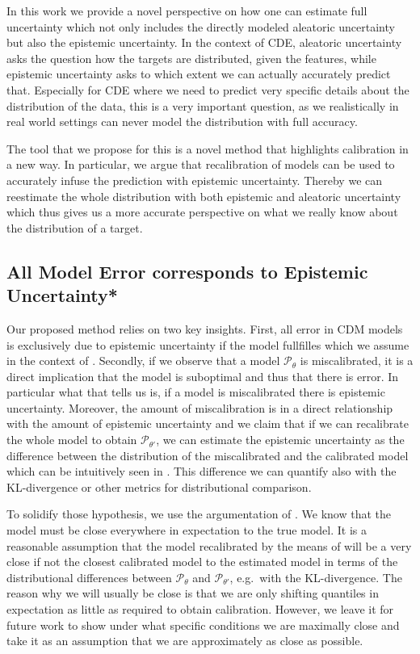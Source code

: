 In this work we provide a novel perspective on how one can estimate full uncertainty which not only includes the directly modeled aleatoric uncertainty but also the epistemic uncertainty. In the context of CDE, aleatoric uncertainty asks the question how the targets are distributed, given the features, while epistemic uncertainty asks to which extent we can actually accurately predict that. Especially for CDE where we need to predict very specific details about the distribution of the data, this is a very important question, as we realistically in real world settings can never model the distribution with full accuracy.

The tool that we propose for this is a novel method that highlights calibration in a new way. In particular, we argue that recalibration of models can be used to accurately infuse the prediction with epistemic uncertainty. Thereby we can reestimate the whole distribution with both epistemic and aleatoric uncertainty which thus gives us a more accurate perspective on what we really know about the distribution of a target.

\subsection{All Model Error corresponds to Epistemic Uncertainty*}\label{sec:uncertainty_calibration_connection}

Our proposed method relies on two key insights. First, all error in CDM models is exclusively due to epistemic uncertainty if the model fullfilles  which we assume in the context of . Secondly, if we observe that a model $\mathscr{P}_\theta$ is miscalibrated, it is a direct implication that the model is suboptimal and thus that there is error. In particular what that tells us is, if a model is miscalibrated there is epistemic uncertainty. Moreover, the amount of miscalibration is in a direct relationship with the amount of epistemic uncertainty and we claim that if we can recalibrate the whole model to obtain $\mathscr{P}_{\theta'}$, we can estimate the epistemic uncertainty as the difference between the distribution of the miscalibrated and the calibrated model which can be intuitively seen in . This difference we can quantify also with the KL-divergence or other metrics for distributional comparison.

To solidify those hypothesis, we use the argumentation of . We know that the model must be close everywhere in expectation to the true model. It is a reasonable assumption that the model recalibrated by the means of  will be a very close if not the closest calibrated model to the estimated model in terms of the distributional differences between $\mathscr{P}_\theta$ and $\mathscr{P}_{\theta'}$, e.g.\ with the KL-divergence. The reason why we will usually be close is that we are only shifting quantiles in expectation as little as required to obtain calibration. However, we leave it for future work to show under what specific conditions we are maximally close and take it as an assumption that we are approximately as close as possible.

